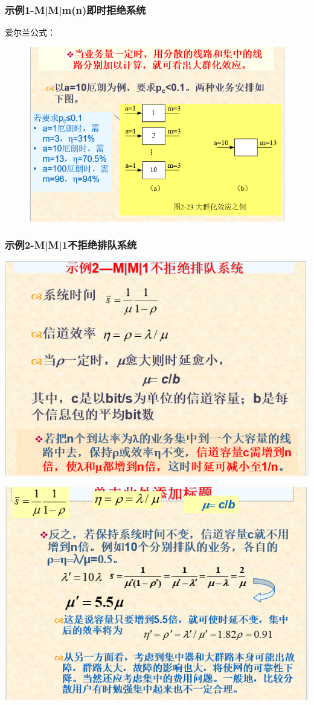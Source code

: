 \subsubsection{示例1-M|M|m(n)即时拒绝系统}
爱尔兰公式：
\begin{figure}
	\centering
	\includegraphics[width=0.7\linewidth]{figures/screenshot034}
	\caption{}
	\label{fig:screenshot034}
\end{figure}
\subsubsection{示例2-M|M|1不拒绝排队系统}
\begin{minipage}{\linewidth}

	\centering
	\includegraphics[width=0.5\linewidth]{figures/screenshot035}
	
	
	\includegraphics[width=0.5\linewidth]{figures/screenshot036}

\end{minipage}
